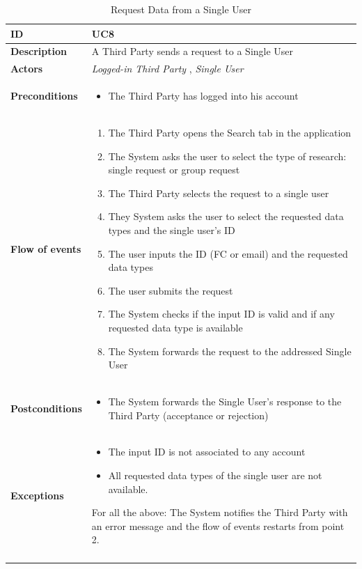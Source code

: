 \documentclass[titlepage]{article}
\begin{document}
\begin{longtable}{| p{3 cm} | p{10 cm} |} 
			\hline
			{\bf ID} & UC8 \\
			\hline
			{\bf Description} & A Third Party sends a request to a Single User \\
			\hline
			{\bf Actors} & {\it Logged-in Third Party }, {\it Single User} \\
			\hline
			{\bf Preconditions} & 		
							\begin{itemize}
								\item The Third Party has logged into his account
							\end{itemize}
			\\
			\hline
			{\bf Flow of events} & 
							\begin{enumerate}
								\item The Third Party opens the Search tab in the application
\item The System asks the user to select the type of research: single request or group request
\item The Third Party selects the request to a single user
\item They System asks the user to select the requested data types and the single user’s ID
\item The user inputs the ID (FC or email) and the requested data types 
\item The user submits the request
\item The System checks if the input ID is valid and if any requested data type is available
\item The System forwards the request to the addressed Single User

							\end{enumerate}
			
			 \\
			\hline
			{\bf Postconditions} & 
							\begin{itemize}
								\item The System forwards the Single User’s response to the Third Party (acceptance or rejection)

							\end{itemize}
			\\
			\hline
			{\bf Exceptions} & 
							\begin{itemize}
								\item The input ID is not associated to any account
\item All requested data types of the single user are not available.

							\end{itemize}
							For all the above: The System notifies the Third Party with an error message and the flow of events restarts from point 2.

							
			\\
			\hline
			\caption{Request Data from a Single User}
			\end{longtable}
\end{document}
